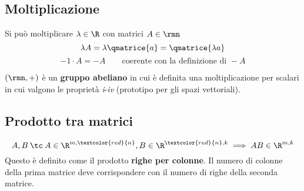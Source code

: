 \subsection{Moltiplicazione}

Si può moltiplicare $\lambda \in \R$ con matrici $A\in\rmn$
\[
\lambda A=\lambda\qmatrice{a}=\qmatrice{\lambda a}
\]
\[
-1\cdot A = -A\qquad\text{coerente con la definizione di }-A
\]

\esempio{
\[
2\begin{pmatrix}
3 & 1 & 0\\
-1 & 4 & 1
\end{pmatrix}=\begin{pmatrix}
6 & 2 & 0\\
-2 & 8 & 2
\end{pmatrix}
\]
}



$(\rmn, +)$ è un \textbf{gruppo abeliano} in cui è definita una moltiplicazione per scalari in cui valgono le proprietà \textit{i}-\textit{iv} (prototipo per gli spazi vettoriali).

\subsection{Prodotto tra matrici}
\[
A,B\:\tc\: A\in\R^{m,\textcolor{red}{n}}, B\in\R^{\textcolor{red}{n}, k}\implies AB\in \R^{m, k}
\]
Questo è definito come il prodotto \textbf{righe per colonne}. Il numero di colonne della prima matrice deve corrispondere con il numero di righe della seconda matrice.


